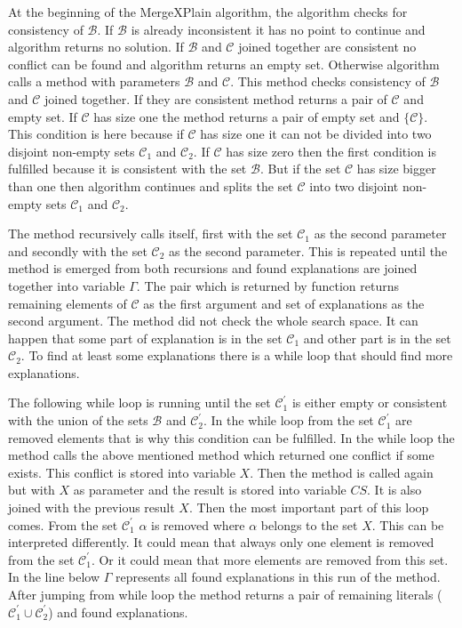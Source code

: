 \documentclass[12pt,a4paper]{article}
\begin{document}
At the beginning of the MergeXPlain algorithm, the algorithm checks for consistency of $\mathcal{B}$. If $\mathcal{B}$ is already inconsistent it has no point to continue and algorithm returns no solution. If $\mathcal{B}$ and $\mathcal{C}$ joined together are consistent no conflict can be found and algorithm returns an empty set. Otherwise algorithm calls a method  with parameters $\mathcal{B}$ and $\mathcal{C}$. This method checks consistency of $\mathcal{B}$ and $\mathcal{C}$ joined together. If they are consistent method returns a pair of $\mathcal{C}$ and empty set. If $\mathcal{C}$ has size one the method returns a pair of empty set and $\{ \mathcal{C} \}$. This condition is here because if $\mathcal{C}$ has size one it can not be divided into two disjoint non-empty sets $\mathcal{C}_{1}$ and $\mathcal{C}_{2}$. If $\mathcal{C}$ has size zero then the first condition is fulfilled because it is consistent with the set $\mathcal{B}$. But if the set $\mathcal{C}$ has size bigger than one then algorithm continues and splits the set $\mathcal{C}$ into two disjoint non-empty sets $\mathcal{C}_{1}$ and $\mathcal{C}_{2}$. 

The method recursively calls itself, first with the set $\mathcal{C}_{1}$ as the second parameter and secondly with the set $\mathcal{C}_{2}$ as the second parameter. This is repeated until the method is emerged from both recursions and found explanations are joined together into variable $\Gamma$. The pair which is returned by function  returns remaining elements of $\mathcal{C}$ as the first argument and set of explanations as the second argument. The method did not check the whole search space. It can happen that some part of explanation is in the set $\mathcal{C}_{1}$ and other part is in the set $\mathcal{C}_{2}$. To find at least some explanations there is a while loop that should find more explanations. 

The following while loop is running until the set $\mathcal{C}^{\prime}_{1}$ is either empty or consistent with the union of the sets $\mathcal{B}$ and $\mathcal{C}^{\prime}_{2}$. In the while loop from the set $\mathcal{C}^{\prime}_{1}$ are removed elements that is why this condition can be fulfilled. In the while loop the method calls the above mentioned method  which returned one conflict if some exists. This conflict is stored into variable $X$. Then the  method is called again but with $X$ as parameter and the result is stored into variable $CS$. It is also joined with the previous result $X$. Then the most important part of this loop comes. From the set $\mathcal{C}^{\prime}_{1}$ $\alpha$ is removed where $\alpha$ belongs to the set $X$. This can be interpreted differently. It could mean that always only one element is removed from the set $\mathcal{C}^{\prime}_{1}$. Or it could mean that more elements are removed from this set. In the line below $\Gamma$ represents all found explanations in this run of the method. After jumping from while loop the method returns a pair of remaining literals ($\mathcal{C}^{\prime}_{1} \cup \mathcal{C}^{\prime}_{2}$) and found explanations.
\end{document}
